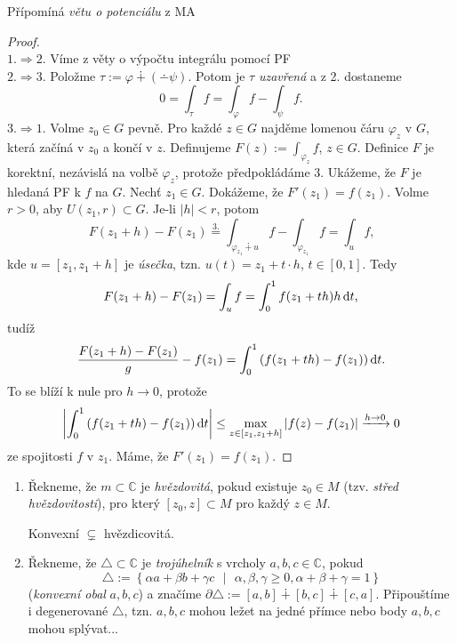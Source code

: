 \begin{note}
Přípomíná \emph{větu o potenciálu} z MA 
\end{note}

\begin{proof}
\mbox{}\\
$1. \Rightarrow 2.$ Víme z věty o výpočtu integrálu pomocí PF\\
$2. \Rightarrow 3.$ Položme $\tau:=\varphi \dotplus(\dotminus\psi)$. Potom je $\tau$ \emph{uzavřená} a z 2. dostaneme $$0=\int_\tau f=\int_\varphi f - \int_\psi f\text{.}$$
$3. \Rightarrow 1.$ Volme $z_0\in G$ pevně. Pro každé $z\in G$ najděme lomenou čáru $\varphi_z$ v $G$, která začíná v $z_0$ a končí v $z$. 
Definujeme $F(z):=\int_{\varphi_z} f$, $z\in G$. 
Definice $F$ je korektní, nezávislá na volbě $\varphi_z$, protože předpokládáme 3. Ukážeme, že $F$ je hledaná PF k $f$ na $G$. Nechť $z_1\in G$. Dokážeme, že $F'(z_1)=f(z_1)$. 
Volme $r>0$, aby $U(z_1,r)\subset G$. Je-li $|h|<r$, 
potom $$F(z_1+h)-F(z_1)\stackrel{3.}{=}\int_{\varphi_{z_1}\dotplus u} f-\int_{\varphi_{z_1}}f=\int_u f\text{,}$$
kde $u=\left[z_1,z_1+h \right]$ je \emph{úsečka}, tzn. $u(t)=z_1+t\cdot h$, $t\in[0,1]$. 
Tedy $$F(z_1+h)-F(z_1)=\int_u f=\int_0^1 f(z_1+th)h \mathop{}\!\mathrm{d} t\text{,}$$tudíž $$\frac{F(z_1+h)-F(z_1)}{g}-f(z_1)=\int_0^1 \left(f(z_1+th)-f(z_1)\right)\mathop{}\!\mathrm{d} t\text{.}$$ To se blíží k nule pro $h\rightarrow0$, protože 
$$\left| \int_0^1\left(f(z_1+th)-f(z_1)\right)\mathop{}\!\mathrm{d} t\right| \leq \max_{z\in[z_1,z_1+h]}\left|f(z)-f(z_1)\right| \xrightarrow{ h\rightarrow 0}0$$
ze spojitosti $f$ v $z_1$. Máme, že $F'(z_1)=f(z_1)$.
\end{proof}

\begin{notation}
\mbox{}
\begin{enumerate}
    \item 
        Řekneme, že $m\subset\mathbb{C}$ je \emph{hvězdovitá}, pokud existuje $z_0\in M$ (tzv. \emph{střed hvězdovitosti}), pro který $[z_0,z]\subset M$ pro každý $z\in M$.
        \begin{note*}
            Konvexní $\subsetneq$ hvězdicovitá.
        \end{note*}
    \item
        Řekneme, že $\triangle\subset\mathbb{C}$ 
        je \emph{trojúhelník} s vrcholy $a,b,c\in\mathbb{C}$, 
        pokud $$\triangle:=\left\{ \alpha a+\beta b + \gamma c\text{ }|\text{ }\alpha,\beta,\gamma\geq 0,\alpha+\beta+\gamma=1 \right\}$$ (\emph{konvexní obal }$a,b,c$) a značíme
        $\partial\triangle:=[a,b]\dotplus[b,c]\dotplus[c,a]$. 
        Připouštíme i degenerované $\triangle$, tzn. $a,b,c$ mohou ležet na jedné přímce nebo body $a,b,c$ mohou splývat...
\end{enumerate}
\end{notation}

